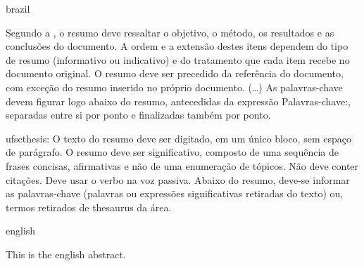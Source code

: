 %
\begin{otherlanguage*}{brazil}
\begin{resumo}

    Segundo a , o resumo deve ressaltar o
    objetivo, o método, os resultados e as conclusões do documento. A ordem e a extensão
    destes itens dependem do tipo de resumo (informativo ou indicativo) e do
    tratamento que cada item recebe no documento original. O resumo deve ser
    precedido da referência do documento, com exceção do resumo inserido no
    próprio documento. (\ldots) As palavras-chave devem figurar logo abaixo do
    resumo, antecedidas da expressão Palavras-chave:, separadas entre si por
    ponto e finalizadas também por ponto.

    ufscthesis: O texto do resumo deve ser digitado, em um único bloco, sem espaço de parágrafo. O resumo deve
    ser significativo, composto de uma sequência de frases concisas, afirmativas e não de uma
    enumeração de tópicos. Não deve conter citações. Deve usar o verbo na voz passiva. Abaixo do
    resumo, deve-se informar as palavras-chave (palavras ou expressões significativas retiradas do
    texto) ou, termos retirados de thesaurus da área. \showfont


\end{resumo}
\end{otherlanguage*}


\begin{otherlanguage*}{english}
\begin{resumo}[Abstract]

    This is the english abstract.


\end{resumo}
\end{otherlanguage*}




